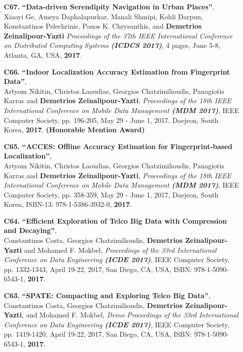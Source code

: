 \documentclass[10pt]{article}
\begin{document}
\begin{enumerate}
\item[{\bf C67.}]
\label{C67} %
{\bf ``Data-driven Serendipity Navigation in Urban Places''}, \\
Xiaoyi Ge, Ameya Daphalapurkar, Manali Shmipi, Kohli Darpun, Konstantinos Pelechrinis, Panos K. Chrysanthis, and {\bf Demetrios Zeinalipour-Yazti}
{\em Proceedings of the 37th IEEE International Conference on Distributed Computing Systems {\bf (ICDCS 2017)}}, 4 pages,
June 5-8, Atlanta, GA, USA, {\bf 2017}.

\item[{\bf C66.}]
\label{C66} %
{\bf ``Indoor Localization Accuracy Estimation from Fingerprint Data''}, \\
Artyom Nikitin, Christos Laoudias,  Georgios Chatzimilioudis, Panagiotis Karras and {\bf Demetrios Zeinalipour-Yazti},
{\em Proceedings of the 18th IEEE International Conference on Mobile Data Management {\bf (MDM 2017)}}, IEEE Computer Society, pp. 196-205, May 29 - June 1, 2017, Daejeon, South Korea, {\bf 2017}. {\bf (Honorable Mention Award)}

\item[{\bf C65.}]
\label{C65} %
{\bf ``ACCES: Offline Accuracy Estimation for Fingerprint-based Localization''}, \\
Artyom Nikitin, Christos Laoudias,  Georgios Chatzimilioudis, Panagiotis Karras and {\bf Demetrios Zeinalipour-Yazti},
{\em Proceedings of the 18th IEEE International Conference on Mobile Data Management {\bf (MDM 2017)}}, IEEE Computer Society, pp. 358-359, May 29 - June 1, 2017, Daejeon, South Korea, ISBN-13: 978-1-5386-3932-0, {\bf 2017}.

\item[{\bf C64.}]
\label{C64} %
{\bf ``Efficient Exploration of Telco Big Data with Compression and Decaying''}, \\
Constantinos Costa, Georgios Chatzimilioudis, {\bf Demetrios Zeinalipour-Yazti} and Mohamed F. Mokbel,
{\em Proceedings of the 33rd International Conference on Data Engineering {\bf (ICDE 2017)}}, IEEE Computer Society, pp. 1332-1343, April 19-22, 2017, San Diego, CA, USA, ISBN: 978-1-5090-6543-1, {\bf 2017}.

\item[{\bf C63.}]
\label{C63} %
{\bf ``SPATE: Compacting and Exploring Telco Big Data''}, \\
Constantinos Costa, Georgios Chatzimilioudis, {\bf Demetrios Zeinalipour-Yazti}, and Mohamed F. Mokbel,
{\em Demo Proceedings of the 33rd International Conference on Data Engineering {\bf (ICDE 2017)}}, IEEE Computer Society, pp. 1419-1420, April 19-22, 2017, San Diego, CA, USA, ISBN: 978-1-5090-6543-1, {\bf 2017}.


\end{enumerate}
\end{document}
